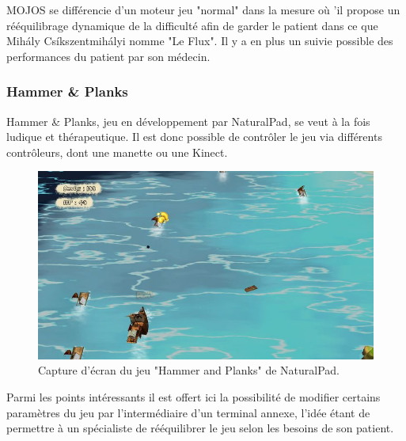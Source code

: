 MOJOS se différencie d'un moteur jeu "normal" dans la mesure où 'il propose
un rééquilibrage dynamique de la difficulté afin de garder le patient dans
ce que Mihály Csíkszentmihályi nomme "Le Flux". Il y a en plus un suivie possible 
des performances du patient par son médecin.


\subsubsection{Hammer \& Planks}
Hammer \& Planks, jeu en développement par NaturalPad, se veut à la fois 
ludique et thérapeutique. Il est donc possible de contrôler le jeu via différents contrôleurs, dont une manette ou une Kinect.

\begin{figure}[h!]
\centering
\includegraphics[width=1.0\linewidth]{images/hammer_and_planks}
\caption{Capture d'écran du jeu "Hammer and Planks" de 
NaturalPad.}
\end{figure}

Parmi les points intéressants il est offert ici la possibilité de modifier certains
paramètres du jeu par l'intermédiaire d'un terminal annexe, l'idée étant de
permettre à un spécialiste de rééquilibrer le jeu selon les besoins de son
patient.
